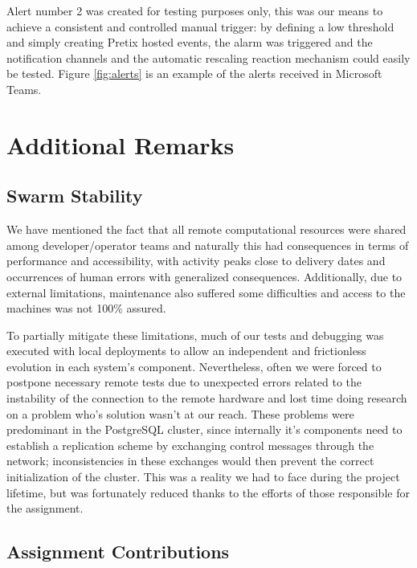 \documentclass[12pt]{article}
\begin{document}
Alert number 2 was created for testing purposes only, this was our means to achieve a consistent and controlled manual trigger:
by defining a low threshold and simply creating Pretix hosted events, the alarm was triggered and the notification channels and the automatic rescaling reaction
mechanism could easily be tested.
Figure \ref{fig:alerts} is an example of the alerts received in Microsoft Teams.

\section{Additional Remarks} \label{remarks} %

\subsection{Swarm Stability} \label{remarks.stability} %

We have mentioned the fact that all remote computational resources were shared among developer/operator teams and naturally this had consequences in terms of 
performance and accessibility, with activity peaks close to delivery dates and occurrences of human errors with generalized consequences.
Additionally, due to external limitations, maintenance also suffered some difficulties and access to the machines was not 100\% assured.

To partially mitigate these limitations, much of our tests and debugging was executed with local deployments to allow an independent and frictionless evolution 
in each system's component.
Nevertheless, often we were forced to postpone necessary remote tests due to unexpected errors related to the instability of the connection to the remote 
hardware and lost time doing research on a problem who's solution wasn't at our reach.
These problems were predominant in the PostgreSQL cluster, since internally it's components need to establish a replication scheme by exchanging control messages
through the network; inconsistencies in these exchanges would then prevent the correct initialization of the cluster.
This was a reality we had to face during the project lifetime, but was fortunately reduced thanks to the efforts of those responsible for the assignment.

\subsection{Assignment Contributions} \label{remarks.contributions} %
\end{document}
